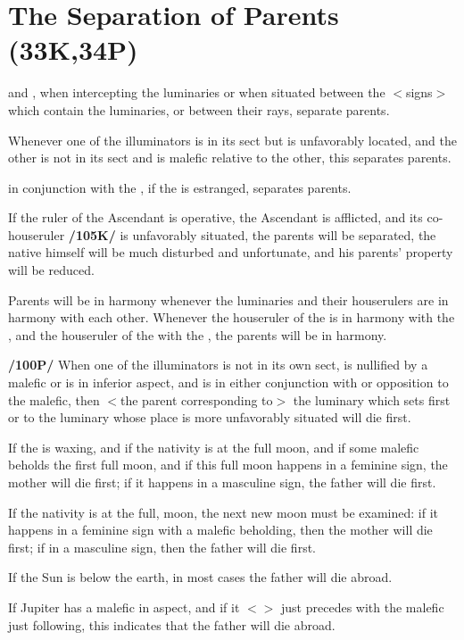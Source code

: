 \section{The Separation of Parents (33K,34P)}

\Mars\xspace and \Saturn, when intercepting the luminaries or when situated between the $<$signs$>$ which contain the luminaries, or between their rays, separate parents. 

Whenever one of the illuminators is in its sect but is unfavorably located, and the other is not in its sect and is malefic relative to the other, this separates parents. 

\Saturn\xspace in conjunction with the \Sun, if the \Moon\xspace is estranged, separates parents. 

If the ruler of the Ascendant is operative, the Ascendant is afflicted, and its co-houseruler \textbf{/105K/} is unfavorably
situated, the parents will be separated, the native himself will be much disturbed and unfortunate, and his parents’ property will be reduced. 

Parents will be in harmony whenever the luminaries and their
houserulers are in harmony with each other. Whenever the houseruler of the \Sun\xspace is in harmony with the \Moon, and the houseruler of the \Moon\xspace with the \Sun, the parents will be in harmony.

\textbf{/100P/} When one of the illuminators is not in its own sect, is nullified by a malefic or is in inferior aspect, and is in either conjunction with or opposition to the malefic, then $<$the parent corresponding to$>$ the luminary which sets first or to the luminary whose place is more unfavorably situated will die first. 

If the \Moon\xspace is waxing, and if the nativity is at the full moon, and if some malefic beholds the first full moon,
and if this full moon happens in a feminine sign, the mother will die first; if it happens in a masculine sign, the father will die first. 

If the nativity is at the full, moon, the next new moon must be examined: if it happens in a feminine sign with a malefic beholding, then the mother will die first; if in a masculine sign, then the father will die first.

If the Sun is below the earth, in most cases the father will die abroad. 

If Jupiter has a malefic in aspect, and if it $<$\Jupiter$>$ just precedes with the malefic just following, this indicates that the father will die abroad. 

